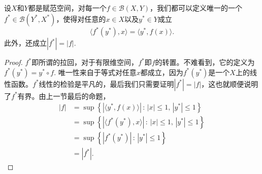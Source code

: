 \begin{thm}
设$X$和$Y$都是赋范空间，对每一个$f\in \mathcal{B}(X,Y)$，我们都可以定义唯一的一个$f^*\in \mathcal{B}(Y^*,X^*)$，使得对任意的$x\in X$以及$y^*\in Y$成立
\[
	\langle f^*(y^*),x\rangle=\langle y^*,f(x)\rangle.
\]
此外，还成立$|f^*|=|f|$.
\end{thm}
\begin{proof}
$f^*$即所谓的拉回，对于有限维空间，$f^*$即$f$的转置。不难看到，它的定义为$f^*(y^*)=y^*\circ f$. 唯一性来自于等式对任意$x$都成立，因为$f^*(y^*)$是一个$X$上的线性函数。$f^*$线性的检验是平凡的，最后我们只需要证明$|f^*|=|f|$，这也就顺便说明了$f^*$有界。由上一节最后的命题，
\begin{align*}
|f|&=\sup \left\{|\langle y^*,f(x)\rangle |\,:\, |x|\leq 1,\, |y^*|\leq 1\right\}\\
&=\sup \left\{|\langle f^*(y^*),x\rangle |\,:\, |x|\leq 1,\, |y^*|\leq 1\right\}\\
&=\sup \left\{|f^*(y^*)|\,:\, |y^*|\leq 1\right\}\\
&=|f^*|.
\end{align*}
\end{proof}